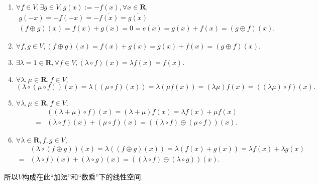 \begin{solution}
\begin{enumerate}
\begin{enumerate}
                    \item $\forall f \in V, \exists g \in V, g(x) := -f(x), \forall x \in \mathbf{R},$
                    \begin{gather*}
                        g(-x) = -f(-x) = -\overline{f(x)} = \overline{g(x)} \\
                        (f \oplus g)(x) = f(x)+g(x) = 0 = e(x) = g(x) + f(x) = (g \oplus f)(x).
                    \end{gather*}

                    \item $\forall f, g \in V, (f \oplus g)(x) = f(x)+g(x) = g(x)+f(x) = (g \oplus f)(x).$

                    \item $\exists \lambda = 1 \in \mathbf{R}, \forall f \in V, (\lambda \circ f)(x) = \lambda f(x) = f(x)$.

                    \item $\forall \lambda, \mu \in \mathbf{R}, f \in V,$
                    \[(\lambda \circ (\mu \circ f))(x) = \lambda((\mu \circ f)(x)) = \lambda (\mu f(x)) = (\lambda \mu) f(x) = ((\lambda \mu) \circ f)(x).\]

                    \item $\forall \lambda, \mu \in \mathbf{R}, f \in V,$
                    \begin{align*}
                        & ((\lambda + \mu) \circ f)(x) = (\lambda + \mu)f(x) = \lambda f(x) + \mu f(x) \\ ={} & (\lambda \circ f)(x) + (\mu \circ f)(x) = ((\lambda \circ f) \oplus (\mu \circ f))(x).
                    \end{align*}

                    \item $\forall \lambda \in \mathbf{R}, f, g \in V,$
                    \begin{align*}
                        & (\lambda \circ (f \oplus g))(x) = \lambda((f \oplus g)(x)) = \lambda (f(x)+g(x)) = \lambda f(x) + \lambda g(x) \\ ={} & (\lambda \circ f)(x) + (\lambda \circ g)(x) = ((\lambda \circ f) \oplus (\lambda \circ g))(x).
                    \end{align*}
                \end{enumerate}
                所以$V$构成在此“加法”和“数乘”下的线性空间.
    \end{enumerate}
\end{solution}

